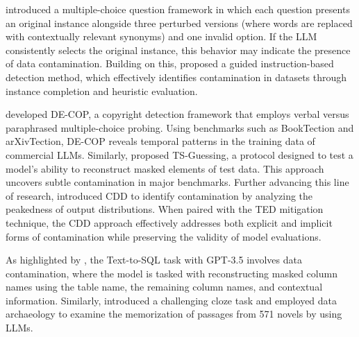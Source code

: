 \citet{golchin2023data} introduced a multiple-choice question framework in which each question presents an original instance alongside three perturbed versions (where words are replaced with contextually relevant synonyms) and one invalid option. If the LLM consistently selects the original instance, this behavior may indicate the presence of data contamination. Building on this, \citet{golchin2023time} proposed a guided instruction-based detection method, which effectively identifies contamination in datasets through instance completion and heuristic evaluation.


\citet{duarte2024decopdetectingcopyrightedcontent} developed DE-COP, a copyright detection framework that employs verbal versus paraphrased multiple-choice probing. Using benchmarks such as BookTection and arXivTection, DE-COP reveals temporal patterns in the training data of commercial LLMs. Similarly, \citet{deng2023investigating} proposed TS-Guessing, a protocol designed to test a model's ability to reconstruct masked elements of test data. This approach uncovers subtle contamination in major benchmarks. Further advancing this line of research, \citet{dong-etal-2024-generalization} introduced CDD to identify contamination by analyzing the peakedness of output distributions. When paired with the TED mitigation technique, the CDD approach effectively addresses both explicit and implicit forms of contamination while preserving the validity of model evaluations.



As highlighted by \cite{ranaldi-etal-2024-investigating}, the Text-to-SQL task with GPT-3.5 involves data contamination, where the model is tasked with reconstructing masked column names using the table name, the remaining column names, and contextual information. Similarly, \citet{chang-etal-2023-speak} introduced a challenging cloze task and employed data archaeology to examine the memorization of passages from 571 novels by using LLMs.








